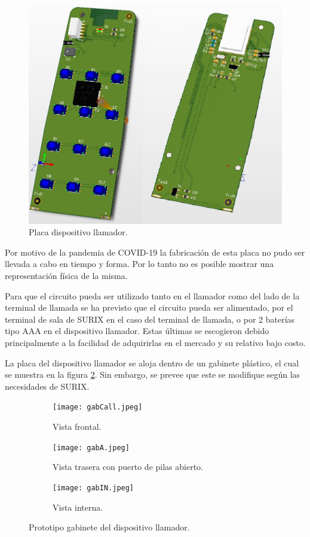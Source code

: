 \begin{figure}[htpb]
	\centering
	\includegraphics[scale=0.4]{./Figures/placas.jpeg}
	\caption{Placa dispositivo llamador.}
	\label{fig:pcb}
\end{figure}

Por motivo de la pandemia de COVID-19 la fabricación de esta placa no pudo ser llevada a cabo en tiempo y forma. Por lo tanto no es posible mostrar una representación física de la misma.

Para que el circuito pueda ser utilizado tanto en el llamador como del lado de la terminal de llamada se ha previsto que el circuito pueda ser alimentado, por el terminal de sala de SURIX en el caso del terminal de llamada, o por 2 baterías tipo AAA en el dispositivo llamador. Estas últimas se escogieron debido principalmente a la facilidad de adquirirlas en el mercado y su relativo bajo costo.

La placa del dispositivo llamador se aloja dentro de un gabinete plástico, el cual se muestra en la figura \ref{fig:gabinete}. Sin embargo, se prevee que este se modifique según las necesidades de SURIX.

\begin{figure}[htpb]
	\centering
   	\begin{subfigure}[b]{0.3\textwidth}
   		\centering
      	\texttt{[image: gabCall.jpeg]}
      	\caption{Vista frontal.}
   	\end{subfigure}%
   	\begin{subfigure}[b]{0.3\textwidth}
   		\centering
      	\texttt{[image: gabA.jpeg]}
      	\caption{Vista trasera con puerto de pilas abierto.}
   	\end{subfigure}%
   	\begin{subfigure}[b]{0.3\textwidth}
   		\centering
      	\texttt{[image: gabIN.jpeg]}
      	\caption{Vista interna.}
   	\end{subfigure}%
	\caption{Prototipo gabinete del dispositivo llamador.}
	\label{fig:gabinete}
\end{figure}

